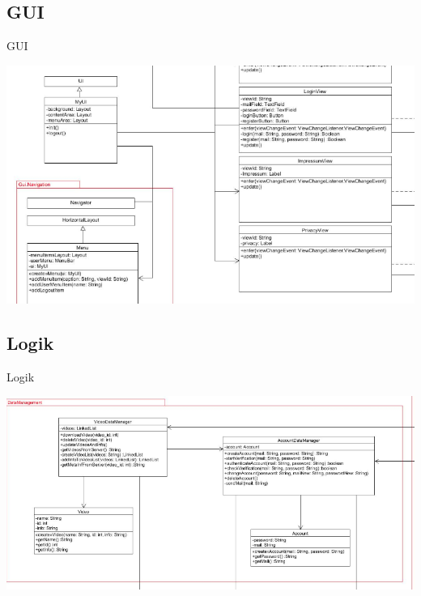 \documentclass[19pt]{beamer}
\begin{document}
\subsection{GUI}
\begin{frame}{GUI}
\begin{center}
\includegraphics[scale=0.35]{resources/interface_gui.png}
\end{center}
\end{frame}
\subsection{Logik}
\begin{frame}{Logik}
\begin{center}
\includegraphics[scale=0.35]{resources/interface_logic.png}
\end{center}
\end{frame}
\end{document}
